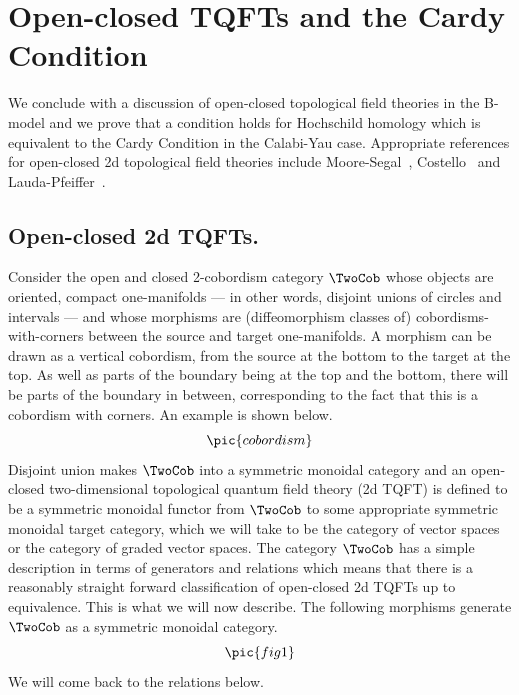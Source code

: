 \section{Open-closed TQFTs and the Cardy Condition}
\label{sec:cardy}

We conclude with a discussion of open-closed topological field theories in the B-model and we prove that a condition holds for
Hochschild homology which is equivalent to the Cardy Condition in the
Calabi-Yau case.  Appropriate references for open-closed 2d
topological field theories include Moore-Segal~\cite{MooSeg},
Costello~\cite{Cos} and Lauda-Pfeiffer~\cite{LaudaPfeifer}.

 \subsection{Open-closed 2d TQFTs.}
Consider the open and closed 2-cobordism category $\TwoCob$ whose
objects are oriented, compact one-manifolds --- in other words,
disjoint unions of circles and intervals --- and whose morphisms are
(diffeomorphism classes of) cobordisms-with-corners between the source
and target one-manifolds.  A morphism can be drawn as a vertical
cobordism, from the source at the bottom to the target at the top.  As
well as parts of the boundary being at the top and the bottom, there
will be parts of the boundary in between, corresponding to the fact
that this is a cobordism with corners.  An example is shown below.
\[\pic{cobordism}\]
Disjoint union makes $\TwoCob$ into a symmetric monoidal category and
an open-closed two-dimensional topological quantum field theory (2d
TQFT) is defined to be a symmetric monoidal functor from $\TwoCob$ to
some appropriate symmetric monoidal target category, which we will
take to be the category of vector spaces or the category of graded
vector spaces.  The category $\TwoCob$ has a simple description in
terms of generators and relations which means that there is a
reasonably straight forward classification of open-closed 2d TQFTs up
to equivalence.  This is what we will now describe.  The following
morphisms generate $\TwoCob$ as a symmetric monoidal category.
\[\pic{fig1}\]
We will come back to the relations below.


